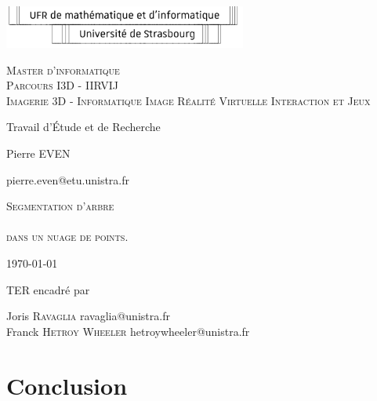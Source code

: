 \documentclass [twoside,a4paper,11pt,french] {report}
\begin{document}

\begin{center}
    \includegraphics [width=8cm] {logo-ufr.pdf}       

    \vfill

    {
	\large
	\textsc{
	    Master d'informatique \\
	    Parcours I3D - IIRVIJ \\
		Imagerie 3D - Informatique Image Réalité Virtuelle Interaction et Jeux
	}
    }

    \bigskip\bigskip
    \bigskip\bigskip

    {\huge Travail d'Étude et de Recherche}

    \bigskip\bigskip

    {\large Pierre \textsc{EVEN}}

    {\small pierre.even@etu.unistra.fr}

    \vfill

    {
	\huge
	\textsc{
		Segmentation d'arbre \\
	    ~ \\
	    dans un nuage de points.
	}
    }

    \vfill
    \vfill

    \today

    \vfill

    {\large TER encadré par}

    \medskip

    {
		\large Joris \textsc{Ravaglia} \small{ravaglia@unistra.fr}\\
		\large Franck \textsc{Hetroy Wheeler} \small{hetroywheeler@unistra.fr}
	}

    \bigskip

    \bigskip
\end{center}


{
    \parskip=0pt
    \tableofcontents
}

\cleardoublepage



\chapter{Conclusion}
    \label{chap:conc}
\end{document}
